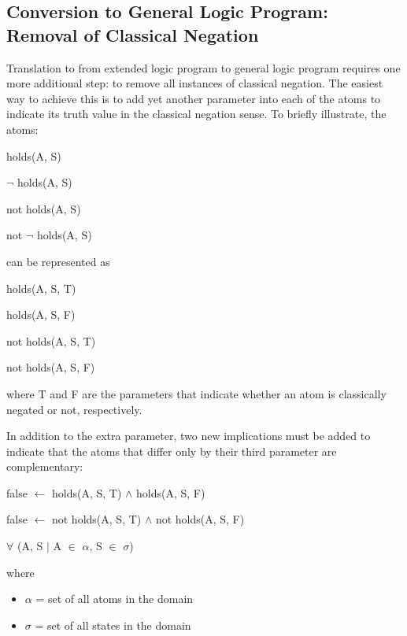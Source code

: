 \documentclass[a4paper]{article}
\begin{document}
    \subsection{Conversion to General Logic Program: Removal of Classical Negation}

      Translation to from extended logic program to general logic program 
      requires one more additional step: to remove all instances of classical 
      negation. The easiest way to achieve this is to add yet another parameter
      into each of the atoms to indicate its truth value in the classical
      negation sense. To briefly illustrate, the atoms:

      \begin{list}{}{}
        \item holds(A, S)
        \item $\lnot$ holds(A, S)
        \item not holds(A, S)
        \item not $\lnot$ holds(A, S)
      \end{list}

      can be represented as

      \begin{list}{}{}
        \item holds(A, S, T)
        \item holds(A, S, F)
        \item not holds(A, S, T)
        \item not holds(A, S, F)
      \end{list}

      where T and F are the parameters that indicate whether an atom is
      classically negated or not, respectively.

      In addition to the extra parameter, two new implications must be added
      to indicate that the atoms that differ only by their third parameter
      are complementary:

      \begin{list}{}{}
        \item false $\leftarrow$ holds(A, S, T) $\land$ holds(A, S, F)
        \item false $\leftarrow$ not holds(A, S, T) $\land$ not holds(A, S, F)
      \end{list}

      $\forall$ (A, S $\mid$ A $\in$ $\alpha$, S $\in$ $\sigma$)

      where

      \begin{itemize}
        \item $\alpha$ = set of all atoms in the domain
        \item $\sigma$ = set of all states in the domain
      \end{itemize}
\end{document}
